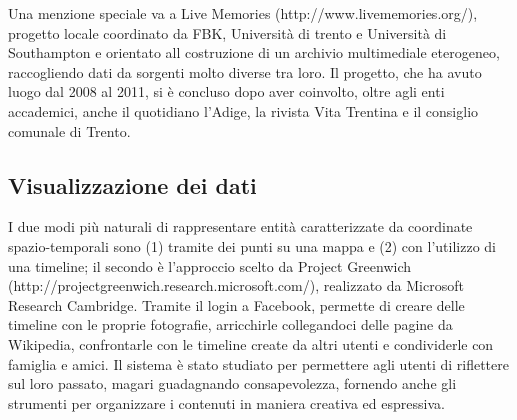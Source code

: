 \documentclass[sigproc-sp.tex]{subfiles}
\begin{document}
Una menzione speciale va a Live Memories (http://www.livememories.org/), progetto locale coordinato da FBK, Università di trento e Università di Southampton e orientato all costruzione di un archivio multimediale eterogeneo, raccogliendo dati da sorgenti molto diverse tra loro. Il progetto, che ha avuto luogo dal 2008 al 2011, si è concluso dopo aver coinvolto, oltre agli enti accademici, anche il quotidiano l’Adige, la rivista Vita Trentina e il consiglio comunale di Trento.

\subsection{Visualizzazione dei dati}
I due modi più naturali di rappresentare entità caratterizzate da coordinate spazio-temporali sono (1) tramite dei punti su una mappa e (2) con l’utilizzo di una timeline; il secondo è l’approccio scelto da Project Greenwich (http://projectgreenwich.research.microsoft.com/), realizzato da Microsoft Research Cambridge. Tramite il login a Facebook, permette di creare delle timeline con le proprie fotografie, arricchirle collegandoci delle pagine da Wikipedia, confrontarle con le timeline create da altri utenti e condividerle con famiglia e amici. Il sistema è stato studiato per permettere agli utenti di riflettere sul loro passato, magari guadagnando consapevolezza, fornendo anche gli strumenti per organizzare i contenuti in maniera creativa ed espressiva.
\end{document}
